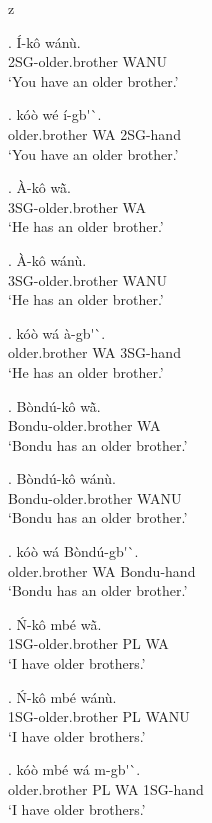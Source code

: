 z   \documentclass{assets/fieldnotes}
\begin{document}
\exg. \'{I}-k\^{o} w\'{a}n\`{u}. \\
2SG-older.brother WANU \\
`You have an older brother.' 

\exg. k\'{o}\`{o} w\'{e} \'{i}-gb\'{}\`{}. \\
older.brother WA 2SG-hand \\
`You have an older brother.' 

\exg. \`{A}-k\^{o} wã̀. \\
3SG-older.brother WA \\
`He has an older brother.'

\exg. \`{A}-k\^{o} w\'{a}n\`{u}. \\
3SG-older.brother WANU \\
`He has an older brother.' 

\exg. k\'{o}\`{o} w\'{a} \`{a}-gb\'{}\`{}. \\
older.brother WA 3SG-hand \\
`He has an older brother.' 

\exg. B\`{o}nd\'{u}-k\^{o} wã̀. \\
Bondu-older.brother WA \\
`Bondu has an older brother.'

\exg. B\`{o}nd\'{u}-k\^{o} w\'{a}n\`{u}. \\
Bondu-older.brother WANU \\
`Bondu has an older brother.' 

\exg. k\'{o}\`{o} w\'{a}  B\`{o}nd\'{u}-gb\'{}\`{}. \\
older.brother WA Bondu-hand \\
`Bondu has an older brother.' 


\exg. \'{N}-k\^{o} mb\'{e} wã̀. \\
1SG-older.brother PL WA \\
`I have older brothers.' 

\exg. \'{N}-k\^{o} mb\'{e} w\'{a}n\`{u}. \\
1SG-older.brother PL WANU \\
`I have older brothers.' 

\exg. k\'{o}\`{o} mb\'{e} w\'{a} m-gb\'{}\`{}. \\
older.brother PL WA 1SG-hand \\
`I have older brothers.' 
\end{document}
